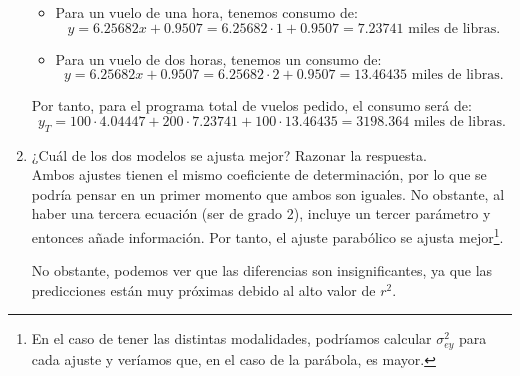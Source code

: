 \begin{ejercicio}
\begin{enumerate}
\begin{itemize}
            \item Para un vuelo de una hora, tenemos consumo de:
            \begin{equation*}
                y = 6.25682x +0.9507 = 6.25682\cdot 1 +0.9507 = 7.23741 \text{ miles de libras.}
            \end{equation*}

            \item Para un vuelo de dos horas, tenemos un consumo de:
            \begin{equation*}
                y = 6.25682x +0.9507 = 6.25682\cdot 2 +0.9507 = 13.46435 \text{ miles de libras.}
            \end{equation*}
        \end{itemize}
        Por tanto, para el programa total de vuelos pedido, el consumo será de:
        \begin{equation*}
            y_T = 100\cdot 4.04447 + 200\cdot 7.23741 + 100\cdot 13.46435 = 3198.364\text{ miles de libras.}
        \end{equation*}

        \item ¿Cuál de los dos modelos se ajusta mejor? Razonar la respuesta.\\
        Ambos ajustes tienen el mismo coeficiente de determinación, por lo que se podría pensar en un primer momento que ambos son iguales. No obstante, al haber una tercera ecuación (ser de grado 2), incluye un tercer parámetro y entonces añade información. Por tanto, el ajuste parabólico se ajusta mejor\footnote{En el caso de tener las distintas modalidades, podríamos calcular $\sigma_{ey}^2$ para cada ajuste y veríamos que, en el caso de la parábola, es mayor.}.

        No obstante, podemos ver que las diferencias son insignificantes, ya que las predicciones están muy próximas debido al alto valor de $r^2$.
    \end{enumerate}
\end{ejercicio}

